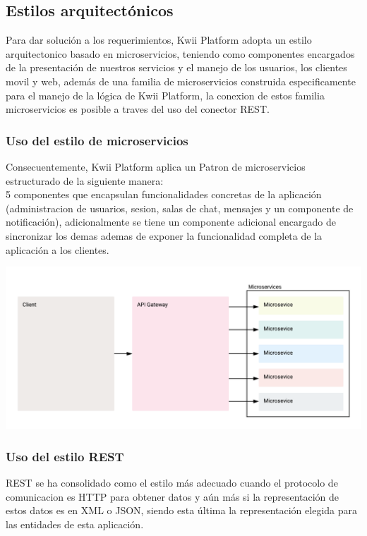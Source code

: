 \subsection{Estilos arquitectónicos}

Para dar solución a los requerimientos, Kwii Platform adopta un estilo arquitectonico basado en microservicios, teniendo como componentes encargados de la presentación de nuestros servicios y el manejo de los usuarios, los clientes movil y web, además de una familia de microservicios construida especificamente para el manejo de la lógica de Kwii Platform, la conexion de estos familia microservicios es posible a traves del uso del conector REST.

\subsubsection{Uso del estilo de microservicios}

Consecuentemente, Kwii Platform aplica un Patron de microservicios estructurado de la siguiente manera:\\ 

5 componentes que encapsulan funcionalidades concretas de la aplicación (administracion de usuarios, sesion, salas de chat, mensajes y un componente de notificación), adicionalmente se tiene un componente adicional encargado de sincronizar los demas ademas de exponer la funcionalidad completa de la aplicación a los clientes.

\begin{center}
    \includegraphics[width=14cm]{Figures/P2/microservices.png}    
\end{center}


\subsubsection{Uso del estilo REST}

REST se ha consolidado como el estilo más adecuado cuando el protocolo de comunicacion es HTTP para obtener datos y aún más si la representación de estos datos es en XML o JSON, siendo esta última la representación elegida para las entidades de esta aplicación.



